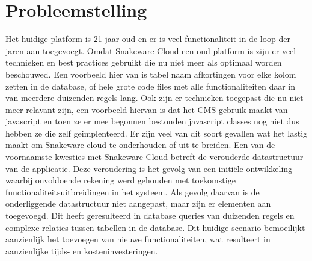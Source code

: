 \section{Probleemstelling}
{}
Het huidige platform is 21 jaar oud en er is veel functionaliteit in de loop der jaren aan toegevoegt.
Omdat Snakeware Cloud een oud platform is zijn er veel technieken en best practices gebruikt die nu niet meer als optimaal worden beschouwed.
Een voorbeeld hier van is tabel naam afkortingen voor elke kolom zetten in de database, of hele grote code files met alle functionaliteiten daar in van meerdere duizenden regels lang. 
Ook zijn er technieken toegepast die nu niet meer relavant zijn, een voorbeeld hiervan is dat het CMS gebruik maakt van javascript en toen ze er mee begonnen bestonden javascript classes nog niet dus hebben ze die zelf geimplenteerd.
Er zijn veel van dit soort gevallen wat het lastig maakt om Snakeware cloud te onderhouden of uit te breiden.
\whitespace
Een van de voornaamste kwesties met Snakeware Cloud betreft de verouderde datastructuur van de applicatie.
Deze veroudering is het gevolg van een initiële ontwikkeling waarbij onvoldoende rekening werd gehouden met toekomstige functionaliteitsuitbreidingen in het systeem.
Als gevolg daarvan is de onderliggende datastructuur niet aangepast, maar zijn er elementen aan toegevoegd.
Dit heeft geresulteerd in database queries van duizenden regels en complexe relaties tussen tabellen in de database.
Dit huidige scenario bemoeilijkt aanzienlijk het toevoegen van nieuwe functionaliteiten, wat resulteert in aanzienlijke tijds- en kosteninvesteringen.
